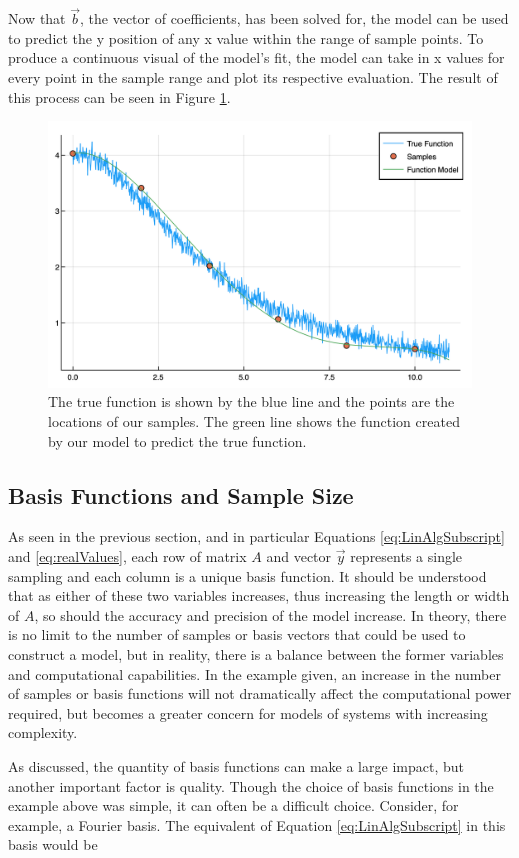 \par Now that $\vec{b}$, the vector of coefficients, has been solved for, the model can be used to predict the y position of any x value within the range of sample points. To produce a continuous visual of the model's fit, the model can take in x values for every point in the sample range and plot its respective evaluation. The result of this process can be seen in Figure \ref{fig:func1True}.

\begin{figure}[h]
\includegraphics[scale = 0.4]{Figures/func1True}
\caption{The true function is shown by the blue line and the points are the locations of our samples. The green line shows the function created by our model to predict the true function.
\label{fig:func1True}} 
\end{figure}



\subsection{Basis Functions and Sample Size}\label{Sect:samplesAndFunctions}
\par As seen in the previous section, and in particular Equations \ref{eq:LinAlgSubscript} and \ref{eq:realValues}, each row of matrix $A$ and vector $\vec{y}$ represents a single sampling and each column is a unique basis function. It should be understood that as either of these two variables increases, thus increasing the length or width of $A$, so should the accuracy and precision of the model increase. In theory, there is no limit to the number of samples or basis vectors that could be used to construct a model, but in reality, there is a balance between the former variables and computational capabilities. In the example given, an increase in the number of samples or basis functions will not dramatically affect the computational power required, but becomes a greater concern for models of systems with increasing complexity. 
\par As discussed, the quantity of basis functions can make a large impact, but another important factor is quality. Though the choice of basis functions in the example above was simple, it can often be a difficult choice. Consider, for example, a Fourier basis. The equivalent of Equation \ref{eq:LinAlgSubscript} in this basis would be

